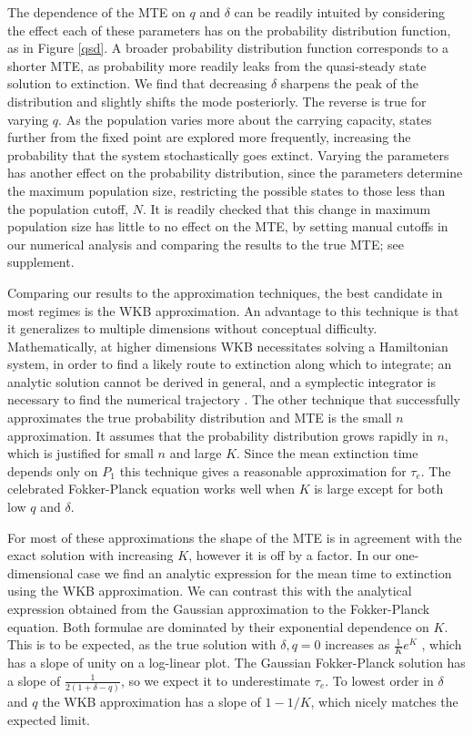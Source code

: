 The dependence of the MTE on $q$ and $\delta$ can be readily intuited by considering the effect each of these parameters has on the probability distribution function, as in Figure \ref{qsd}.
A broader probability distribution function corresponds to a shorter MTE, as probability more readily leaks from the quasi-steady state solution to extinction.
We find that decreasing $\delta$ sharpens the peak of the distribution and slightly shifts the mode posteriorly. 
The reverse is true for varying $q$. 
As the population varies more about the carrying capacity, states further from the fixed point are explored more frequently, increasing the probability that the system stochastically goes extinct. 
Varying the parameters has another effect on the probability distribution, since the parameters determine the maximum population size, restricting the possible states to those less than the population cutoff, $N$.
It is readily checked that this change in maximum population size has little to no effect on the MTE, by setting manual cutoffs in our numerical analysis and comparing the results to the true MTE; see supplement.

Comparing our results to the approximation techniques, the best candidate in most regimes is the WKB approximation.
An advantage to this technique is that it generalizes to multiple dimensions without conceptual difficulty.
Mathematically, at higher dimensions WKB necessitates solving a Hamiltonian system, in order to find a likely route to extinction along which to integrate; an analytic solution cannot be derived in general, and a symplectic integrator is necessary to find the numerical trajectory \cite{Channell1990}.
The other technique that successfully approximates the true probability distribution and MTE is the small $n$ approximation. 
It assumes that the probability distribution grows rapidly in $n$, which is justified for small $n$ and large $K$.
Since the mean extinction time depends only on $P_1$ this technique gives a reasonable approximation for $\tau_e$. 
The celebrated Fokker-Planck equation works well when $K$ is large except for both low $q$ and $\delta$. 

For most of these approximations the shape of the MTE is in agreement with the exact solution with increasing $K$, however it is off by a factor.
In our one-dimensional case we find an analytic expression for the mean time to extinction using the WKB approximation.
We can contrast this with the analytical expression obtained from the Gaussian approximation to the Fokker-Planck equation. 
Both formulae are dominated by their exponential dependence on $K$.
This is to be expected, as the true solution with $\delta,q = 0$ increases as $\frac{1}{K}e^K$ \cite{Lande1993}, which has a slope of unity on a log-linear plot. 
The Gaussian Fokker-Planck solution has a slope of $\frac{1}{2(1+\delta-q)}$, so we expect it to underestimate $\tau_e$. 
To lowest order in $\delta$ and $q$ the WKB approximation has a slope of $1-1/K$, which nicely matches the expected limit.

